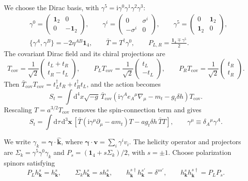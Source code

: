 \documentclass[a4paper,12pt]{article}
\newcommand{\ii}{\mathrm i}
\newcommand{\mb}{\mathbf}
\newcommand{\di}{\mathrm d}
\begin{document}
We choose the Dirac basis, with
$\gamma^5=\ii\gamma^0\gamma^1\gamma^2\gamma^3$:
\begin{align}
 &\gamma^0=\begin{pmatrix}\mathbf1_2&0\\0&-\mathbf1_2\end{pmatrix},\qquad
 \gamma^i=\begin{pmatrix}0&\sigma^i\\-\sigma^i&0\end{pmatrix},\qquad
 \gamma^5=\begin{pmatrix}0&\mathbf1_2\\\mathbf1_2&0\end{pmatrix},
 \nonumber\\
 &\{\gamma^A,\gamma^B\}=-2\eta^{AB}\mathbf1_4,\qquad
 \bar T=T^\dagger\gamma^0,\qquad
 P_{L,R}=\frac{\mathbf1_4\mp\gamma^5}{2}.
 \label{eq:dirac-clifford}
\end{align}
The covariant Dirac field and its chiral projections are
\begin{equation}
 T_{\mathrm{cov}}=\frac1{\sqrt2}
 \begin{pmatrix}t_L+t_R\\t_R-t_L\end{pmatrix},\qquad
 P_LT_{\mathrm{cov}}=\frac1{\sqrt2}\begin{pmatrix}t_L\\-t_L\end{pmatrix},\qquad
 P_RT_{\mathrm{cov}}=\frac1{\sqrt2}\begin{pmatrix}t_R\\t_R\end{pmatrix}.
 \label{eq:dirac-field}
\end{equation}
Then $\bar T_{\mathrm{cov}}T_{\mathrm{cov}}
=t_L^\dagger t_R+t_R^\dagger t_L$, and the action becomes
\begin{equation}
 S_t=\int\di^4x\sqrt{-g}\,
 \bar T_{\mathrm{cov}}
 \left(\ii\gamma^Ae_A{}^\mu\nabla_\mu-m_t-g_t\delta h\right)
 T_{\mathrm{cov}}.
 \label{eq:dirac-covariant-action}
\end{equation}
Rescaling $T=a^{3/2}T_{\mathrm{cov}}$ removes the spin-connection
term and gives
\begin{equation}
 S_t=\int\di\tau\,\di^3\mb x\,
 \left[\bar T(\ii\gamma^\mu\partial_\mu-a m_t)T
       -a g_t\delta h\,\bar T T\right],
 \qquad \gamma^\mu\equiv\delta_A{}^\mu\gamma^A.
 \label{eq:dirac-rescaled-action}
\end{equation}

We write $\gamma_k=\bm\gamma\cdot\widehat{\mb k}$,
where $\bm\gamma\cdot\mb v=\sum_i\gamma^iv_i$. The helicity operator
and projectors are $\Sigma_k=\gamma^5\gamma^0\gamma_k$ and
$P_s=(\mathbf1_4+s\Sigma_k)/2$, with $s=\pm1$.
Choose polarization spinors satisfying
\begin{equation}
 P_Lh^s_{\mb k}=h^s_{\mb k},\qquad
 \Sigma_kh^s_{\mb k}=s h^s_{\mb k},\qquad
 h^{s\dagger}_{\mb k}h^{s'}_{\mb k}=\delta^{ss'},\qquad
 h^s_{\mb k}h^{s\dagger}_{\mb k}=P_LP_s.
 \label{eq:dirac-polarizations}
\end{equation}
\end{document}
